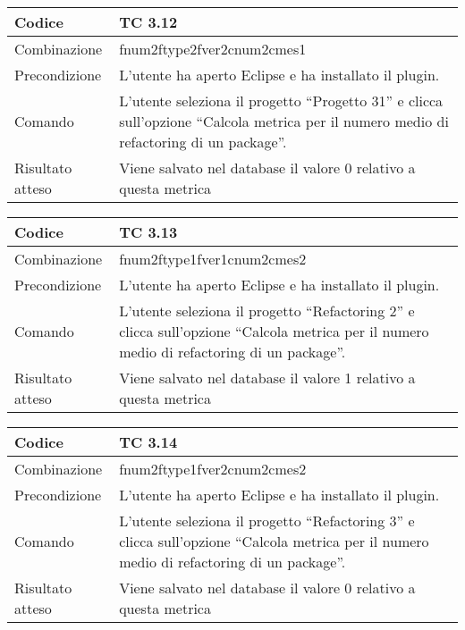 \begin{table}[ht]
\begin{tabular}{|p{3cm}|p{9cm}|}
\hline
\cellcolor{lightgray}Codice				& TC 3.12								\\
\hline
\cellcolor{lightgray}Combinazione		& fnum2ftype2fver2cnum2cmes1 									\\
\hline
\cellcolor{lightgray}Precondizione		& L'utente ha aperto Eclipse e ha installato il plugin.				\\
\hline 
\cellcolor{lightgray}Comando 			& L'utente seleziona il progetto ``Progetto 31''  e clicca sull'opzione ``Calcola metrica per il numero medio di refactoring di un package''.	\\
\hline
\cellcolor{lightgray}Risultato atteso	& Viene salvato nel database il valore 0 relativo a questa metrica	\\
\hline
\end{tabular}
\end{table}

\begin{table}[ht]
\begin{tabular}{|p{3cm}|p{9cm}|}
\hline
\cellcolor{lightgray}Codice				& TC 3.13								\\
\hline
\cellcolor{lightgray}Combinazione		& fnum2ftype1fver1cnum2cmes2 									\\
\hline
\cellcolor{lightgray}Precondizione		& L'utente ha aperto Eclipse e ha installato il plugin.					\\
\hline
\cellcolor{lightgray}Comando			& L'utente seleziona il progetto ``Refactoring 2''  e clicca sull'opzione ``Calcola metrica per il numero medio di refactoring di un package''.	\\
\hline
\cellcolor{lightgray}Risultato atteso	& Viene salvato nel database il valore 1 relativo a questa metrica	\\
\hline
\end{tabular}
\end{table}

\begin{table}[ht]
\begin{tabular}{|p{3cm}|p{9cm}|}
\hline
\cellcolor{lightgray}Codice				& TC 3.14								\\
\hline
\cellcolor{lightgray}Combinazione		& fnum2ftype1fver2cnum2cmes2									\\
\hline
\cellcolor{lightgray}Precondizione		& L'utente ha aperto Eclipse e ha installato il plugin.			\\
\hline
\cellcolor{lightgray}Comando			& L'utente seleziona il progetto ``Refactoring 3''  e clicca sull'opzione ``Calcola metrica per il numero medio di refactoring di un package''.	\\
\hline
\cellcolor{lightgray}Risultato atteso	& Viene salvato nel database il valore 0 relativo a questa metrica	\\
\hline
\end{tabular}
\end{table}

